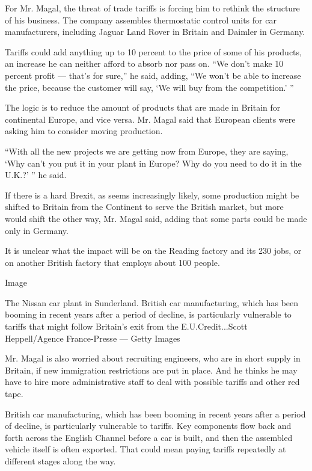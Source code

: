 For Mr. Magal, the threat of trade tariffs is forcing him to rethink the
structure of his business. The company assembles thermostatic control
units for car manufacturers, including Jaguar Land Rover in Britain and
Daimler in Germany.

Tariffs could add anything up to 10 percent to the price of some of his
products, an increase he can neither afford to absorb nor pass on. ``We
don't make 10 percent profit --- that's for sure,'' he said, adding,
``We won't be able to increase the price, because the customer will say,
`We will buy from the competition.' ''

The logic is to reduce the amount of products that are made in Britain
for continental Europe, and vice versa. Mr. Magal said that European
clients were asking him to consider moving production.

``With all the new projects we are getting now from Europe, they are
saying, `Why can't you put it in your plant in Europe? Why do you need
to do it in the U.K.?' '' he said.

If there is a hard Brexit, as seems increasingly likely, some production
might be shifted to Britain from the Continent to serve the British
market, but more would shift the other way, Mr. Magal said, adding that
some parts could be made only in Germany.

It is unclear what the impact will be on the Reading factory and its 230
jobs, or on another British factory that employs about 100 people.

Image

The Nissan car plant in Sunderland. British car manufacturing, which has
been booming in recent years after a period of decline, is particularly
vulnerable to tariffs that might follow Britain's exit from the
E.U.Credit...Scott Heppell/Agence France-Presse --- Getty Images

Mr. Magal is also worried about recruiting engineers, who are in short
supply in Britain, if new immigration restrictions are put in place. And
he thinks he may have to hire more administrative staff to deal with
possible tariffs and other red tape.

British car manufacturing, which has been booming in recent years after
a period of decline, is particularly vulnerable to tariffs. Key
components flow back and forth across the English Channel before a car
is built, and then the assembled vehicle itself is often exported. That
could mean paying tariffs repeatedly at different stages along the way.

